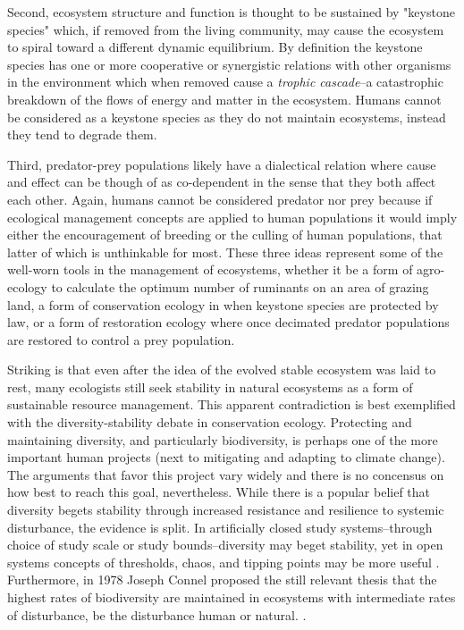 Second, ecosystem structure and function is thought to be sustained by "keystone species" which, if removed from the living community, may cause the ecosystem to spiral toward a different dynamic equilibrium. By definition the keystone species has one or more cooperative or synergistic relations with other organisms in the environment which when removed cause a \textit{trophic cascade}--a catastrophic breakdown of the flows of energy and matter in the ecosystem. Humans cannot be considered as a keystone species as they do not maintain ecosystems, instead they tend to degrade them. 

Third, predator-prey populations likely have a dialectical relation where cause and effect can be though of as co-dependent in the sense that they both affect each other. Again, humans cannot be considered predator nor prey because if ecological management concepts are applied to human populations it would imply either the encouragement of breeding or the culling of human populations, that latter of which is unthinkable for most. These three ideas represent some of the well-worn tools in the management of ecosystems, whether it be a form of agro-ecology to calculate the optimum number of ruminants on an area of grazing land, a form of conservation ecology in when keystone species are protected by law, or a form of restoration ecology where once decimated predator populations are restored to control a prey population. 

Striking is that even after the idea of the evolved stable ecosystem was laid to rest, many ecologists still seek stability in natural ecosystems as a form of sustainable resource management. This apparent contradiction is best exemplified with the diversity-stability debate in conservation ecology. Protecting and maintaining diversity, and particularly biodiversity, is perhaps one of the more important human projects (next to mitigating and adapting to climate change). The arguments that favor this project vary widely and there is no concensus on how best to reach this goal, nevertheless. While there is a popular belief that diversity begets stability through increased resistance and resilience to systemic disturbance, the evidence is split. In artificially closed study systems--through choice of study scale or study bounds--diversity may beget stability, yet in open systems concepts of thresholds, chaos, and tipping points may be more useful \citep[for opposing arguments see][]{tilman_1994,goodman_1975}. Furthermore, in 1978 Joseph Connel proposed the still relevant thesis that the highest rates of biodiversity are maintained in ecosystems with intermediate rates of disturbance, be the disturbance human or natural. \citep{connel_1978}. 

